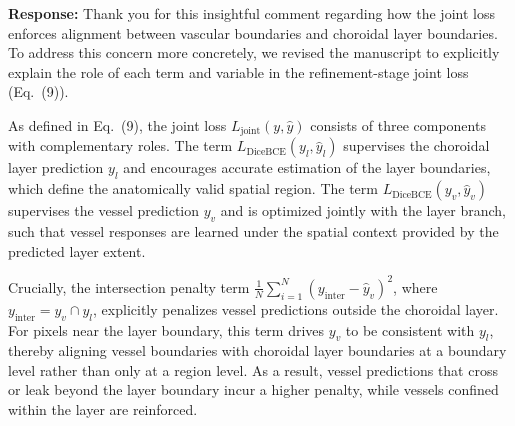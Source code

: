 \documentclass[11pt]{article}
\newcommand{\commentresponse}[2]{{\color{blue}\textbf{Response:} #2}}
\begin{document}
\begin{enumerate}
    \commentresponse{3}{
    Thank you for this insightful comment regarding how the joint loss enforces alignment between vascular boundaries and choroidal layer boundaries.
    To address this concern more concretely, we revised the manuscript to explicitly explain the role of each term and variable in the refinement-stage joint loss (Eq.~(9)).
    
    As defined in Eq.~(9), the joint loss
    $L_{\text{joint}}(y,\hat y)$ consists of three components with complementary roles.
    The term $L_{\text{DiceBCE}}(y_l,\hat{y}_l)$ supervises the choroidal layer prediction $y_l$ and encourages accurate estimation of the layer boundaries, which define the anatomically valid spatial region.
    The term $L_{\text{DiceBCE}}(y_v,\hat{y}_v)$ supervises the vessel prediction $y_v$ and is optimized jointly with the layer branch, such that vessel responses are learned under the spatial context provided by the predicted layer extent.
    
    Crucially, the intersection penalty term
    $\frac{1}{N}\sum_{i=1}^{N}(y_{\text{inter}}-\hat{y}_v)^2$,
    where $y_{\text{inter}} = y_v \cap y_l$,
    explicitly penalizes vessel predictions outside the choroidal layer.
    For pixels near the layer boundary, this term drives $y_v$ to be consistent with $y_l$, thereby aligning vessel boundaries with choroidal layer boundaries at a boundary level rather than only at a region level.
    As a result, vessel predictions that cross or leak beyond the layer boundary incur a higher penalty, while vessels confined within the layer are reinforced.
    
}
\end{enumerate}
\end{document}
